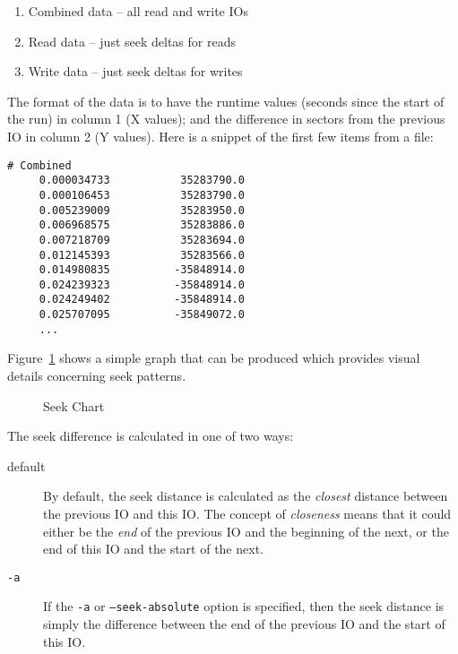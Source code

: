 \documentclass{article}
\begin{document}
  \begin{enumerate}
     \item Combined data -- all read and write IOs

     \item Read data -- just seek deltas for reads

     \item Write data -- just seek deltas for writes
  \end{enumerate}

  The format of the data is to have the runtime values (seconds since
  the start of the run) in column 1 (X values); and the difference in
  sectors from the previous IO in column 2 (Y values). Here is a snippet
  of the first few items from a file:

\begin{verbatim}
# Combined
     0.000034733           35283790.0
     0.000106453           35283790.0
     0.005239009           35283950.0
     0.006968575           35283886.0
     0.007218709           35283694.0
     0.012145393           35283566.0
     0.014980835          -35848914.0
     0.024239323          -35848914.0
     0.024249402          -35848914.0
     0.025707095          -35849072.0
     ...
\end{verbatim}

  Figure~\ref{fig:seek} shows a simple graph that can be produced which
  provides visual details concerning seek patterns.

  \begin{figure}[h!]
  \leavevmode\centering
  \caption{\label{fig:seek}Seek Chart}
  \end{figure}
  \FloatBarrier

  The seek difference is calculated in one of two ways:

  \begin{description}
    \item[default] By default, the seek distance is calculated as the
    \emph{closest} distance between the previous IO and this IO. The
    concept of \emph{closeness} means that it could either be the
    \emph{end} of the previous IO and the beginning of the next, or the
    end of this IO and the start of the next.

    \item[\texttt{-a}] If the \texttt{-a} or \texttt{--seek-absolute}
    option is specified, then the seek distance is simply the difference
    between the end of the previous IO and the start of this IO.
  \end{description}
\end{document}
